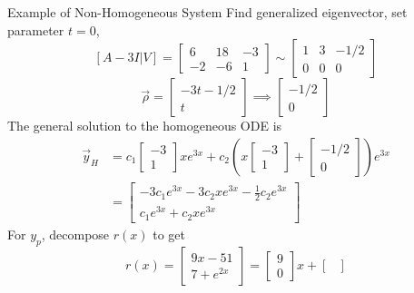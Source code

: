 \documentclass{article}
\begin{document}
\begin{multicols*}{3}
\begin{blackbox}{Example of Non-Homogeneous System}
{            Find generalized eigenvector, set parameter $t = 0$,
            \[[A - 3I| V] = \begin{bmatrix}
                6 & 18 & -3\\
                -2 & -6 & 1
            \end{bmatrix} \sim \begin{bmatrix}
                1 & 3 & -1/2\\
                0 & 0 & 0
            \end{bmatrix}\]
            \[\vec{\rho} = \begin{bmatrix}
                -3t - 1/2\\
                t
            \end{bmatrix} \implies \begin{bmatrix}
                -1/2\\
                0
            \end{bmatrix}\]
            The general solution to the homogeneous ODE is 
            \begin{align*}
                \vec{y}_H &= c_1\begin{bmatrix}-3\\1\end{bmatrix}xe^{3x} + c_2\left(x\begin{bmatrix}
                    -3\\
                    1
                \end{bmatrix} + \begin{bmatrix}
                    -1/2\\
                    0
                \end{bmatrix}\right)e^{3x}  \\
                &= \begin{bmatrix}
                    -3c_1e^{3x} - 3c_2xe^{3x} - \frac{1}{2}c_2e^{3x}\\
                    c_1e^{3x} + c_2xe^{3x}
                \end{bmatrix}
            \end{align*}
            For $y_p$, decompose $r(x)$ to get
            \[r(x) = \begin{bmatrix}
                9x - 51\\
                7 + e^{2x}
            \end{bmatrix} = \begin{bmatrix}
                9\\
                0
            \end{bmatrix}x + \begin{bmatrix}

\end{bmatrix}\]}
\end{blackbox}
\end{multicols*}
\end{document}
